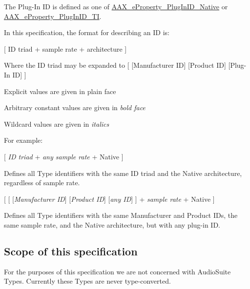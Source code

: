 The Plug-\/\+In ID is defined as one of \mbox{\hyperlink{a00662_a13e384f22825afd3db6d68395b79ce0da89ca3dd6e96895cda14976c1b1ceb826}{A\+A\+X\+\_\+e\+Property\+\_\+\+Plug\+In\+I\+D\+\_\+\+Native}} or \mbox{\hyperlink{a00662_a13e384f22825afd3db6d68395b79ce0da75f174df4efbeca86eaada126c1d9214}{A\+A\+X\+\_\+e\+Property\+\_\+\+Plug\+In\+I\+D\+\_\+\+TI}}.

In this specification, the format for describing an ID is\+:

\mbox{[} ID triad + sample rate + architecture \mbox{]}

Where the ID triad may be expanded to \mbox{[} \mbox{[}Manufacturer ID\mbox{]} \mbox{[}Product ID\mbox{]} \mbox{[}Plug-\/\+In ID\mbox{]} \mbox{]}


\begin{DoxyItemize}
\item Explicit values are given in plain face  
\item Arbitrary constant values are given in {\itshape bold face}  
\item Wildcard values are given in {\itshape italics}  
\end{DoxyItemize}

For example\+: 
\begin{DoxyItemize}
\item \mbox{[} {\itshape ID triad} + {\itshape any sample rate} + Native \mbox{]} 
\begin{DoxyItemize}
\item Defines all Type identifiers with the same ID triad and the Native architecture, regardless of sample rate.  
\end{DoxyItemize}
\item \mbox{[} \mbox{[} \mbox{[}{\itshape Manufacturer ID}\mbox{]} \mbox{[}{\itshape Product ID}\mbox{]} \mbox{[}{\itshape any ID}\mbox{]} \mbox{]} + {\itshape sample rate} + Native \mbox{]} 
\begin{DoxyItemize}
\item Defines all Type identifiers with the same Manufacturer and Product I\+Ds, the same sample rate, and the Native architecture, but with any plug-\/in ID.  
\end{DoxyItemize}
\end{DoxyItemize}\hypertarget{a00826_advancedTopics_relatedTypes_scope}{}\subsection{Scope of this specification}\label{a00826_advancedTopics_relatedTypes_scope}
For the purposes of this specification we are not concerned with Audio\+Suite Types. Currently these Types are never type-\/converted.

